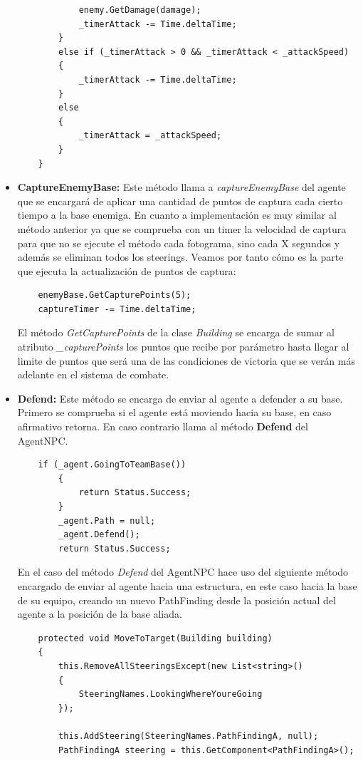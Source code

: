 \begin{itemize}
\begin{lstlisting}
            enemy.GetDamage(damage);
            _timerAttack -= Time.deltaTime;
        }
        else if (_timerAttack > 0 && _timerAttack < _attackSpeed)
        {
            _timerAttack -= Time.deltaTime;
        }
        else
        {
            _timerAttack = _attackSpeed;
        }
    }
    \end{lstlisting}
    \item \textbf{CaptureEnemyBase: } Este método llama a \textit{captureEnemyBase} del agente que se encargará de aplicar una cantidad de puntos de captura cada cierto tiempo a la base enemiga.
    En cuanto a implementación es muy similar al método anterior ya que se comprueba con un timer la velocidad de captura para que no se ejecute el método cada fotograma, sino cada X segundos y además se eliminan todos los steerings. Veamos por tanto cómo es la parte que ejecuta la actualización de puntos de captura:
    \begin{lstlisting}
    enemyBase.GetCapturePoints(5);
    captureTimer -= Time.deltaTime;
    \end{lstlisting}
    
    El método \textit{GetCapturePoints} de la clase \textit{Building} se encarga de sumar al atributo \textit{\_capturePoints} los puntos que recibe por parámetro hasta llegar al limite de puntos que será una de las condiciones de victoria que se verán más adelante en el sistema de combate. 
    \item \textbf{Defend: } Este método se encarga de enviar al agente a defender a su base. Primero se comprueba si el agente está moviendo hacia su base, en caso afirmativo retorna. En caso contrario llama al método \textbf{Defend} del AgentNPC.
    \begin{lstlisting}
    if (_agent.GoingToTeamBase())
        {
            return Status.Success;
        }
        _agent.Path = null;
        _agent.Defend();
        return Status.Success;
    \end{lstlisting}
    En el caso del método \textit{Defend} del AgentNPC hace uso del siguiente método encargado de enviar al agente hacia una estructura, en este caso hacia la base de su equipo, creando un nuevo PathFinding desde la posición actual del agente a la posición de la base aliada.
    \begin{lstlisting}
    protected void MoveToTarget(Building building)
    {
        this.RemoveAllSteeringsExcept(new List<string>()
        {
            SteeringNames.LookingWhereYoureGoing
        });

        this.AddSteering(SteeringNames.PathFindingA, null);
        PathFindingA steering = this.GetComponent<PathFindingA>();


\end{lstlisting}
\end{itemize}
